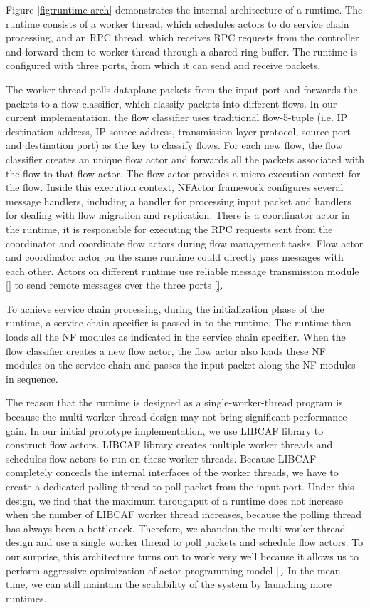 Figure \ref{fig:runtime-arch} demonstrates the internal architecture of a runtime. The runtime consists of a worker thread, which schedules actors to do service chain processing, and an RPC thread, which receives RPC requests from the controller and forward them to worker thread through a shared ring buffer. The runtime is configured with three ports, from which it can send and receive packets.

The worker thread polls dataplane packets from the input port and forwards the packets to a flow classifier, which classify packets into different flows. In our current implementation, the flow classifier uses traditional flow-5-tuple (i.e. IP destination address, IP source address, transmission layer protocol, source port and destination port) as the key to classify flows. For each new flow, the flow classifier creates an unique flow actor and forwards all the packets associated with the flow to that flow actor. The flow actor provides a micro execution context for the flow. Inside this execution context, NFActor framework configures several message handlers, including a handler for processing input packet and handlers for dealing with flow migration and replication. There is a coordinator actor in the runtime, it is responsible for executing the RPC requests sent from the coordinator and coordinate flow actors during flow management tasks. Flow actor and coordinator actor on the same runtime could directly pass messages with each other. Actors on different runtime use reliable message transmission module \ref{} to send remote messages over the three ports \ref{}.

To achieve service chain processing, during the initialization phase of the runtime, a service chain specifier is passed in to the runtime. The runtime then loads all the NF modules as indicated in the service chain specifier. When the flow classifier creates a new flow actor, the flow actor also loads these NF modules on the service chain and passes the input packet along the NF modules in sequence.

The reason that the runtime is designed as a single-worker-thread program is because the multi-worker-thread design may not bring significant performance gain. In our initial prototype implementation, we use LIBCAF \cite{caf} library to construct flow actors. LIBCAF library creates multiple worker threads and schedules flow actors to run on these worker threads. Because LIBCAF completely conceals the internal interfaces of the worker threads, we have to create a dedicated polling thread to poll packet from the input port. Under this design, we find that the maximum throughput of a runtime does not increase when the number of LIBCAF worker thread increases, because the polling thread has always been a bottleneck. Therefore, we abandon the multi-worker-thread design and use a single worker thread to poll packets and schedule flow actors. To our surprise, this architecture turns out to work very well because it allows us to perform aggressive optimization of actor programming model \ref{}. In the mean time, we can still maintain the scalability of the system by launching more runtimes.

